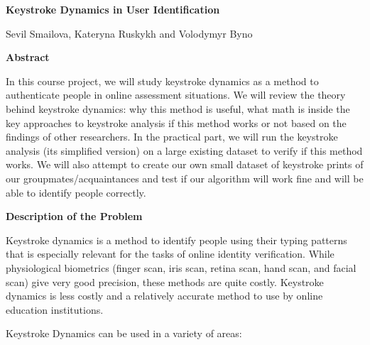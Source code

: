 \documentclass[12pt,a4]{article}
\begin{document}
\begin{center}
  \Huge\bf{Keystroke Dynamics in User Identification}
\end{center}

\begin{center}
	Sevil Smailova, Kateryna Ruskykh and Volodymyr Byno
\end{center}

\large\textbf{Abstract}
\bigskip

\normalsize
In this course project, we will study keystroke dynamics as a method to authenticate people in online assessment situations. We will review the theory behind keystroke dynamics: why this method is useful, what math is inside the key approaches to keystroke analysis if this method works or not based on the findings of other researchers. In the practical part, we will run the keystroke analysis (its simplified version) on a large existing dataset to verify if this method works. We will also attempt to create our own small dataset of keystroke prints of our groupmates/acquaintances and test if our algorithm will work fine and will be able to identify people correctly. 
\bigskip

\large\textbf{Description of the Problem}
\bigskip

\normalsize
Keystroke dynamics is a method to identify people using their typing patterns that is especially relevant for the tasks of online identity verification. While physiological biometrics (finger scan, iris scan, retina scan, hand scan, and facial scan) give very good precision, these methods are quite costly. Keystroke dynamics is less costly and a relatively accurate method to use by online education institutions. 

Keystroke Dynamics can be used in a variety of areas:
\end{document}
